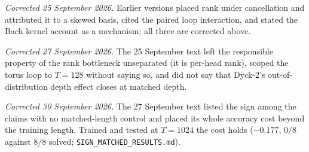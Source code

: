 \documentclass[10pt]{article}
\begin{document}
\emph{Corrected 25 September 2026.} Earlier versions placed rank under cancellation and attributed it to a skewed
basis, cited the paired loop interaction, and stated the Bach kernel account as a mechanism; all three are
corrected above.

\emph{Corrected 27 September 2026.} The 25 September text left the responsible property of the rank bottleneck
unseparated (it is per-head rank), scoped the torus loop to $T=128$ without saying so, and did not say that
Dyck-2's out-of-distribution depth effect closes at matched depth.

\emph{Corrected 30 September 2026.} The 27 September text listed the sign among the claims with no
matched-length control and placed its whole accuracy cost beyond the training length. Trained and tested at
$T=1024$ the cost holds ($-0.177$, $0/8$ against $8/8$ solved; \texttt{SIGN\_MATCHED\_RESULTS.md}).



\end{document}
